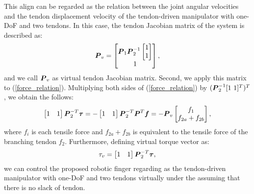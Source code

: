 \documentclass{llncs}
\def\vect#1{\mbox{\boldmath$#1$}}
\begin{document}
This align can be regarded as the relation between the joint angular velocities and the tendon displacement velocity of the tendon-driven manipulator with one-DoF and two tendons.
In this case, the tendon Jacobian matrix of the system is described as:
\begin{align}
	\vect{P}_{v}=
	\begin{bmatrix}
	\vect{P}_{1}\vect{P}_{2}^{-1}
								\begin{bmatrix}
									1\\
									1
								\end{bmatrix}
									\\
	1
	\end{bmatrix},
\end{align}
and we call $\vect{P}_{v}$ as virtual tendon Jacobian matrix.
Second, we apply this matrix to (\ref{force_relation}).
Multiplying both sides of (\ref{force_relation}) by $(\vect{P}_{2}^{-1}[1\ 1]^{T})^{T}$, we obtain the follows:
\begin{align}
	\begin{bmatrix}
		1&1
	\end{bmatrix}
	\vect{P}_{2}^{-T}\vect{\tau}=-
	\begin{bmatrix}
		1&1
	\end{bmatrix}
	\vect{P}_{2}^{-T}\vect{P}^{T}\vect{f}=-\vect{P}_{v}
	\begin{bmatrix}
		f_{1}\\
		f_{2a}+f_{2b}
	\end{bmatrix},
\end{align}
where $f_{i}$ is each tensile force and $f_{2a}+f_{2b}$ is equivalent to the tensile force of the branching tendon $f_{2}$.
Furthermore, defining virtual torque vector as:
\begin{align}
	\tau_{v}=
	\begin{bmatrix}
		1&1
	\end{bmatrix}
	\vect{P}_{2}^{-T}\vect{\tau},
\end{align}
we can control the proposed robotic finger regarding as the tendon-driven manipulator with one-DoF and two tendons virtually under the assuming that there is no slack of tendon.
\end{document}
